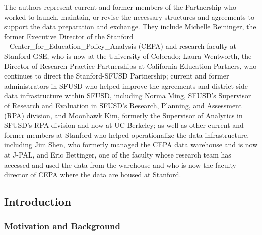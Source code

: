 \documentclass[
]{WileySix}
\begin{document}
The authors represent current and former members of the Partnership who worked to launch, maintain, or revise the necessary structures and agreements to support the data preparation and exchange. They include Michelle Reininger, the former Executive Director of the Stanford +Center\_for\_Education\_Policy\_Analysis\textbar{} (CEPA) and research faculty at Stanford GSE, who is now at the University of Colorado; Laura Wentworth, the Director of Research Practice Partnerships at California Education Partners, who continues to direct the Stanford-SFUSD Partnership; current and former administrators in SFUSD who helped improve the agreements and district-side data infrastructure within SFUSD, including Norma Ming, SFUSD's Supervisor of Research and Evaluation in SFUSD's Research, Planning, and Assessment (RPA) division, and Moonhawk Kim, formerly the Supervisor of Analytics in SFUSD's RPA division and now at UC Berkeley; as well as other current and former members at Stanford who helped operationalize the data infrastructure, including Jim Shen, who formerly managed the CEPA data warehouse and is now at J-PAL, and Eric Bettinger, one of the faculty whose research team has accessed and used the data from the warehouse and who is now the faculty director of CEPA where the data are housed at Stanford.

\hypertarget{introduction-6}{%
\subsection{Introduction}\label{introduction-6}}

\hypertarget{motivation-and-background-5}{%
\subsubsection{Motivation and Background}\label{motivation-and-background-5}}
\end{document}

